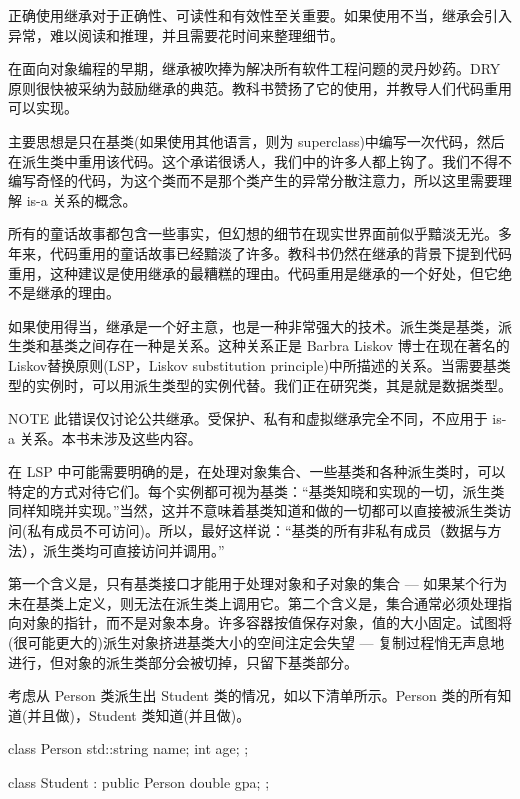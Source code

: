 正确使用继承对于正确性、可读性和有效性至关重要。如果使用不当，继承会引入异常，难以阅读和推理，并且需要花时间来整理细节。

在面向对象编程的早期，继承被吹捧为解决所有软件工程问题的灵丹妙药。DRY 原则很快被采纳为鼓励继承的典范。教科书赞扬了它的使用，并教导人们代码重用可以实现。

主要思想是只在基类(如果使用其他语言，则为 superclass)中编写一次代码，然后在派生类中重用该代码。这个承诺很诱人，我们中的许多人都上钩了。我们不得不编写奇怪的代码，为这个类而不是那个类产生的异常分散注意力，所以这里需要理解 is-a 关系的概念。

所有的童话故事都包含一些事实，但幻想的细节在现实世界面前似乎黯淡无光。多年来，代码重用的童话故事已经黯淡了许多。教科书仍然在继承的背景下提到代码重用，这种建议是使用继承的最糟糕的理由。代码重用是继承的一个好处，但它绝不是继承的理由。


如果使用得当，继承是一个好主意，也是一种非常强大的技术。派生类是基类，派生类和基类之间存在一种是关系。这种关系正是 Barbra Liskov 博士在现在著名的 Liskov替换原则(LSP，Liskov substitution principle)中所描述的关系。当需要基类型的实例时，可以用派生类型的实例代替。我们正在研究类，其是就是数据类型。

\begin{myNotic}{NOTE}
此错误仅讨论公共继承。受保护、私有和虚拟继承完全不同，不应用于 is-a 关系。本书未涉及这些内容。
\end{myNotic}

在 LSP 中可能需要明确的是，在处理对象集合、一些基类和各种派生类时，可以特定的方式对待它们。每个实例都可视为基类：“基类知晓和实现的一切，派生类同样知晓并实现。”当然，这并不意味着基类知道和做的一切都可以直接被派生类访问(私有成员不可访问)。所以，最好这样说：“基类的所有非私有成员（数据与方法），派生类均可直接访问并调用。”

第一个含义是，只有基类接口才能用于处理对象和子对象的集合 — 如果某个行为未在基类上定义，则无法在派生类上调用它。第二个含义是，集合通常必须处理指向对象的指针，而不是对象本身。许多容器按值保存对象，值的大小固定。试图将(很可能更大的)派生对象挤进基类大小的空间注定会失望 — 复制过程悄无声息地进行，但对象的派生类部分会被切掉，只留下基类部分。

考虑从 Person 类派生出 Student 类的情况，如以下清单所示。Person 类的所有知道(并且做)，Student 类知道(并且做)。


\begin{cpp}
class Person {
  std::string name;
  int age;
};

class Student : public Person {
  double gpa;
};
\end{cpp}

